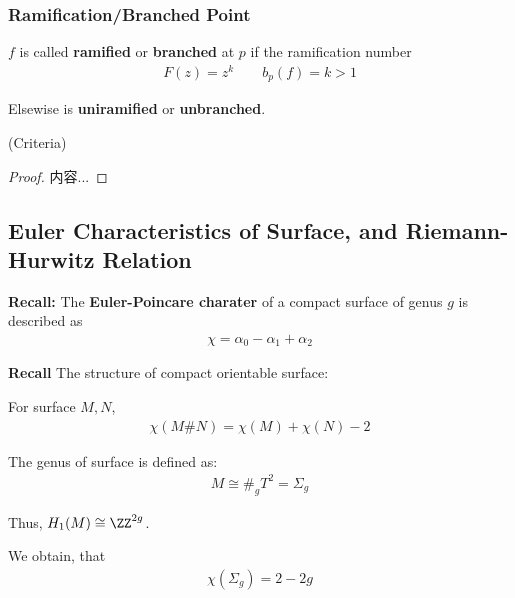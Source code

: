 \documentclass[Total.tex]{subfiles}
\begin{document}
				\subsubsection{Ramification/Branched Point}
					\begin{Def}
						$f$ is called \textbf{ramified} or \textbf{branched} at $p$ if the ramification number
						\begin{gather*}
							F(z)=z^k\qquad b_p(f)=k>1
						\end{gather*}
						
						Elsewise is \textbf{uniramified} or \textbf{unbranched}.
					\end{Def}
					
					\begin{proposition}
						(Criteria)
					\end{proposition}
					\begin{proof}
						内容...
					\end{proof}
			\subsection{Euler Characteristics of Surface, and Riemann-Hurwitz Relation}
			
			\textbf{Recall:} The \textbf{Euler-Poincare charater} of a compact surface of genus $g$ is described as
			\begin{gather*}
				\chi=\alpha_0-\alpha_1+\alpha_2
			\end{gather*}
			
			\textbf{Recall} The structure of compact orientable surface:
			
			\begin{lemma}
				For surface $M,N$,
				\begin{gather*}
					\chi(M\# N)=\chi(M)+\chi(N)-2
				\end{gather*}
			\end{lemma}
			\begin{theorem}
				The genus of surface is defined as: 
				\begin{gather*}
					M\cong \#_g T^2=\Sigma_g
				\end{gather*}
				
				Thus, $H_1(M)\cong \ZZ^{2g}$. 
			\end{theorem}
			
			\begin{corollary}
				We obtain, that
				\begin{gather*}
					\chi(\Sigma_g)=2-2g
				\end{gather*}
			\end{corollary}
			
\end{document}
